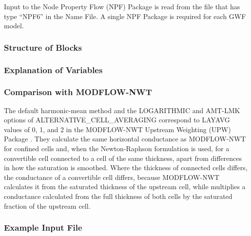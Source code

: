 Input to the Node Property Flow (NPF) Package is read from the file that has type ``NPF6'' in the Name File.  A single NPF Package is required for each GWF model. 

\vspace{5mm}
\subsubsection{Structure of Blocks}



\vspace{5mm}
\subsubsection{Explanation of Variables}
\begin{description}

\end{description}

\vspace{5mm}
\subsubsection{Comparison with MODFLOW-NWT}
The default harmonic-mean method and the LOGARITHMIC and AMT-LMK options of ALTERNATIVE\_CELL\_AVERAGING correspond to LAYAVG values of 0, 1, and 2 in the MODFLOW-NWT Upstream Weighting (UPW) Package \citep{modflownwt}. They calculate the same horizontal conductance as MODFLOW-NWT for confined cells and, when the Newton-Raphson formulation is used, for a convertible cell connected to a cell of the same thickness, apart from differences in how the saturation is smoothed. Where the thickness of connected cells differs, the conductance of a convertible cell differs, because MODFLOW-NWT calculates it from the saturated thickness of the upstream cell, while \mf multiplies a conductance calculated from the full thickness of both cells by the saturated fraction of the upstream cell.

\vspace{5mm}
\subsubsection{Example Input File}


